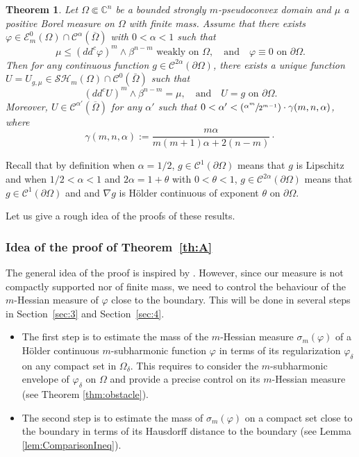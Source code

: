 \documentclass[11pt]{article}
\providecommand{\C}{}
\numberwithin{equation}{section}
\newcommand{\Psfrac}[2]{(\sfrac{#1}{#2})}
\newtheorem{theo}{Theorem}
\theoremstyle{definition}
\renewcommand{\C}{\mathbb{C}}
\newcommand{\Cc}{\mathcal{C}}
\theoremstyle{plain}
\theoremstyle{definition}
\begin{document}
\begin{theo}\label{th:B}
Let $\Omega \Subset \C^n$ be a bounded strongly $m$-pseudoconvex domain and $\mu $ a positive Borel measure on $\Omega$ with finite mass. Assume that there exists $\varphi\in \mathcal{E}^0_m(\Omega)\cap\Cc^{\alpha}(\overline\Omega)$ with $0 < \alpha < 1$ such that
\begin{equation} \label{eq:subsol}
\mu \leq (dd^c\varphi)^m\wedge\beta^{n-m} \text{ weakly on }\Omega, \quad \text{and}\quad \varphi \equiv 0 \text{ on }\partial \Omega.
\end{equation}
Then for any continuous function $g \in \Cc^{2 \alpha} (\partial \Omega)$, there exists a unique function $U = U_{g,\mu} \in \mathcal{SH}_m (\Omega) \cap \Cc^{0} (\bar{\Omega})$ such that
\[
(dd^c U)^m\wedge\beta^{n-m} = \mu, \quad\text{and}\quad U = g \text{ on } \partial \Omega.
\]
Moreover, $U \in \Cc^{\alpha'}(\overline\Omega)$ for any $\alpha'$ such that $0 < \alpha' < \Psfrac{\alpha^m}{2^{m - 1}}\cdot \gamma (m,n,\alpha)$, where
\[
\gamma (m,n,\alpha):= \frac{m \alpha}{ m (m + 1) \alpha + 2 (n-m)}\cdot
\]
\end{theo}

Recall that by definition when $\alpha = 1 \slash 2$, $g \in \Cc^1 (\partial \Omega)$ means that $g$ is Lipschitz and when $1 \slash 2 < \alpha <1$ and $2 \alpha = 1 + \theta$ with $0 < \theta < 1$, $ g \in \Cc^{2 \alpha} (\partial \Omega)$ means that $g \in \Cc^1 (\partial \Omega)$ and and $\nabla g$ is Hölder continuous of exponent $\theta$ on $\partial \Omega$.

Let us give a rough idea of the proofs of these results.

\subsubsection*{Idea of the proof of Theorem~\ref{th:A}}
The general idea of the proof is inspired by \cite{KN19}. However, since our measure is not compactly supported nor of finite mass, we need to control the behaviour of the $m$-Hessian measure of $\varphi$ close to the boundary. This will be done in several steps in Section~\ref{sec:3} and Section~\ref{sec:4}.
\begin{itemize}
\item
The first step is to estimate the mass of the $m$-Hessian measure $\sigma_m (\varphi)$ of a Hölder continuous $m$-subharmonic function $\varphi$ in terms of its regularization $\varphi_\delta$ on any compact set in $\Omega_\delta$. This requires to consider the $m$-subharmonic envelope of $\varphi_\delta$ on $\Omega$ and provide a precise control on its $m$-Hessian measure (see Theorem \ref{thm:obstacle}).

\item
The second step is to estimate the mass of $\sigma_m (\varphi)$ on a compact set close to the boundary in terms of its Hausdorff distance to the boundary (see Lemma \ref{lem:ComparisonIneq}).
\end{itemize}
\end{document}
